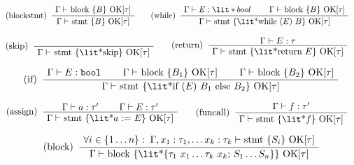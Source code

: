 \documentclass[10pt]{article} %
\theoremstyle{definitionstyle}
\theoremstyle{lemmastyle}
\newcommand{\labelspace}{}
\newenvironment{Block}[1]{%
\begin{Warning}[singleextra={\path let \p1=(P), \p2=(O) in ($(\x2,0)+0.5*(0,\y1)$) node[mdframeleftlinetitle] {#1};}]%
}{%
\end{Warning}%
}
\begin{document}
\begin{Block}{Block/stmt OK}

\begin{align*}
\AxiomC{$\Gamma \vdash $ block \{$B$\} OK[$\tau$]}
\LeftLabel{(blockstmt) \labelspace}
\UnaryInfC{$\Gamma \vdash $ stmt \{$B$\} OK[$\tau$]}
\DisplayProof
&\quad\quad
\AxiomC{$\Gamma \vdash E : \lit*{bool}$}
\AxiomC{$\Gamma \vdash $ block \{$B$\} OK[$\tau$]}
\LeftLabel{(while) \labelspace}
\BinaryInfC{$\Gamma \vdash $ stmt \{\lit*{while ($E$) $B$}\} OK[$\tau$]}
\DisplayProof
\end{align*}

\begin{align*}
\AxiomC{\phantom{kelley}}
\LeftLabel{(skip) \labelspace}
\UnaryInfC{$\Gamma \vdash $ stmt \{\lit*{skip}\} OK[$\tau$]}
\DisplayProof
&\quad\quad
\AxiomC{$\Gamma \vdash E : \tau$}
\LeftLabel{(return) \labelspace}
\UnaryInfC{$\Gamma \vdash $ stmt \{\lit*{return $E$}\} OK[$\tau$]}
\DisplayProof
\end{align*}

\begin{align*}
\AxiomC{$\Gamma \vdash E : \texttt{bool}$}
\AxiomC{$\Gamma \vdash $ block \{$B_1$\} OK[$\tau$]}
\AxiomC{$\Gamma \vdash $ block \{$B_2$\} OK[$\tau$]}
\LeftLabel{(if) \labelspace}
\TrinaryInfC{$\Gamma \vdash $ stmt \{\lit*{if ($E$) $B_1$ else $B_2$}\} OK[$\tau$]}
\DisplayProof
\end{align*}

\begin{align*}
\AxiomC{$\Gamma \vdash a : \tau'$}
\AxiomC{$\Gamma \vdash E : \tau'$}
\LeftLabel{(assign) \labelspace}
\BinaryInfC{$\Gamma \vdash $ stmt \{\lit*{$a$ := $E$}\} OK[$\tau$]}
\DisplayProof
&\quad\quad
\AxiomC{$\Gamma \vdash f : \tau'$}
\LeftLabel{(funcall) \labelspace}
\UnaryInfC{$\Gamma \vdash $ stmt \{\lit*{$f$}\} OK[$\tau$]}
\DisplayProof
\end{align*}

\begin{gather*}
\AxiomC{$\forall i\in \{1 \dots n\}:\;\Gamma, x_1 : \tau_1, \dots x_k : \tau_k \vdash$ stmt \{$S_i$\} OK[$\tau$]}
\LeftLabel{(block) \labelspace}
\UnaryInfC{$\Gamma \vdash $ block \{\lit*{\{$\tau_1$ $x_1 \dots \tau_k$ $x_k$; $S_1 \dots S_n$\}}\} OK[$\tau$]}
\DisplayProof
\end{gather*}

\end{Block}
\end{document}
